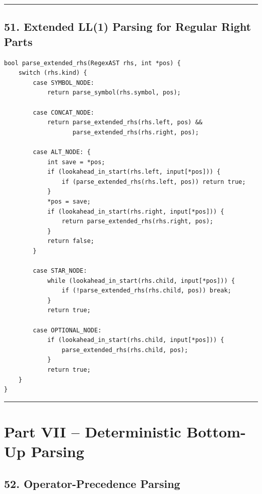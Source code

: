 \documentclass[10pt,letterpaper]{article}
\begin{document}
\medskip\hrule\medskip

\subsection*{51. Extended LL(1) Parsing for Regular Right Parts}

\begin{verbatim}
bool parse_extended_rhs(RegexAST rhs, int *pos) {
    switch (rhs.kind) {
        case SYMBOL_NODE:
            return parse_symbol(rhs.symbol, pos);

        case CONCAT_NODE:
            return parse_extended_rhs(rhs.left, pos) &&
                   parse_extended_rhs(rhs.right, pos);

        case ALT_NODE: {
            int save = *pos;
            if (lookahead_in_start(rhs.left, input[*pos])) {
                if (parse_extended_rhs(rhs.left, pos)) return true;
            }
            *pos = save;
            if (lookahead_in_start(rhs.right, input[*pos])) {
                return parse_extended_rhs(rhs.right, pos);
            }
            return false;
        }

        case STAR_NODE:
            while (lookahead_in_start(rhs.child, input[*pos])) {
                if (!parse_extended_rhs(rhs.child, pos)) break;
            }
            return true;

        case OPTIONAL_NODE:
            if (lookahead_in_start(rhs.child, input[*pos])) {
                parse_extended_rhs(rhs.child, pos);
            }
            return true;
    }
}
\end{verbatim}

\medskip\hrule\medskip

\clearpage
\section*{Part VII -- Deterministic Bottom-Up Parsing}

\subsection*{52. Operator-Precedence Parsing}
\end{document}
